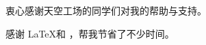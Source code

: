 \begin{acknowledgement}
  衷心感谢天空工场的同学们对我的帮助与支持。

  感谢 \LaTeX 和 \thuthesis\cite{thuthesis}，帮我节省了不少时间。
\end{acknowledgement}
